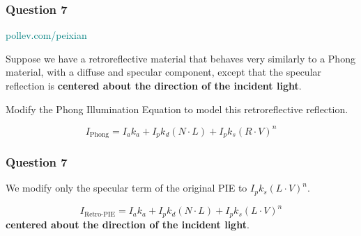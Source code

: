 \documentclass{beamer}
\begin{document}
\begin{frame}
    \frametitle{Question 7}

    \begin{tcolorbox}[colback=teal!5!white]
        \textcolor{teal}{pollev.com/peixian}
    \end{tcolorbox}

    \vspace*{1em}

    \begin{tcolorbox}
        Suppose we have a retroreflective material that behaves very similarly to a Phong material,
        with a diffuse and specular component, except that the specular reflection is \textbf{centered 
        about the direction of the incident light}.
    \end{tcolorbox}

    \vspace*{1em}

    Modify the Phong Illumination Equation to model this retroreflective reflection. 

    \begin{equation*}
        I_\text{Phong} = I_a k_a + I_p k_d  (N \cdot L) + I_p k_s (R \cdot V)^n
    \end{equation*}

\end{frame}

\begin{frame}
    \frametitle{Question 7}

    We modify only the specular term of the original PIE to $I_p k_s (L \cdot V)^n$.

    \begin{tcolorbox}
        \begin{equation*}
            I_\text{Retro-PIE} = I_a k_a + I_p k_d  (N \cdot L) + I_p k_s (L \cdot V)^n
        \end{equation*}
        \textbf{centered about the direction of the incident light}.
    \end{tcolorbox}

\end{frame}
\end{document}
